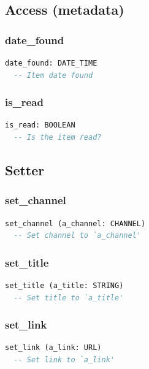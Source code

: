 \subsection{Access (metadata)}
\label{sec:item-access-metadata}

\subsubsection{date\_found}

\begin{lstlisting}[language=Eiffel]
date_found: DATE_TIME
  -- Item date found
\end{lstlisting}

\subsubsection{is\_read}

\begin{lstlisting}[language=Eiffel]
is_read: BOOLEAN
  -- Is the item read?
\end{lstlisting}

\subsection{Setter}
\label{sec:item-setter}

\subsubsection{set\_channel}

\begin{lstlisting}[language=Eiffel]
set_channel (a_channel: CHANNEL)
  -- Set channel to `a_channel'
\end{lstlisting}

\subsubsection{set\_title}

\begin{lstlisting}[language=Eiffel]
set_title (a_title: STRING)
  -- Set title to `a_title'
\end{lstlisting}

\subsubsection{set\_link}

\begin{lstlisting}[language=Eiffel]
set_link (a_link: URL)
  -- Set link to `a_link'
\end{lstlisting}

